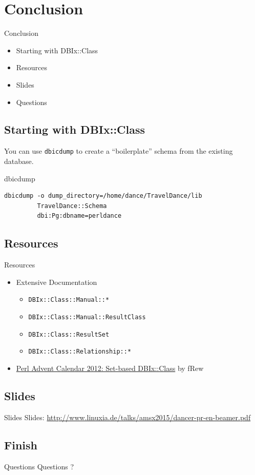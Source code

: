 \section{Conclusion}

\begin{frame}{Conclusion}
\begin{itemize}
\item Starting with DBIx::Class
\item Resources
\item Slides
\item Questions
\end{itemize}
\end{frame}

\subsection{Starting with DBIx::Class}

You can use \verb|dbicdump| to create a ``boilerplate'' schema from the
existing database.

\begin{frame}[fragile]{dbicdump}
\begin{lstlisting}
dbicdump -o dump_directory=/home/dance/TravelDance/lib 
         TravelDance::Schema 
         dbi:Pg:dbname=perldance
\end{lstlisting}
\end{frame}

\subsection{Resources}
\begin{frame}[fragile]{Resources}
\begin{itemize}
\item Extensive Documentation
\begin{itemize}
\item \verb|DBIx::Class::Manual::*|
\item \verb|DBIx::Class::Manual::ResultClass|
\item \verb|DBIx::Class::ResultSet|
\item \verb|DBIx::Class::Relationship::*|
\end{itemize}
\item \href{http://www.perladvent.org/2012/2012-12-21.html}
{Perl Advent Calendar 2012: Set-based DBIx::Class}
by fRew
\end{itemize}
\end{frame}

\subsection{Slides}

\begin{frame}{Slides}
Slides:
\url{http://www.linuxia.de/talks/amsx2015/dancer-pr-en-beamer.pdf}
\end{frame}

\subsection{Finish}

\begin{frame}{Questions}
\centering
Questions ?
\end{frame}



